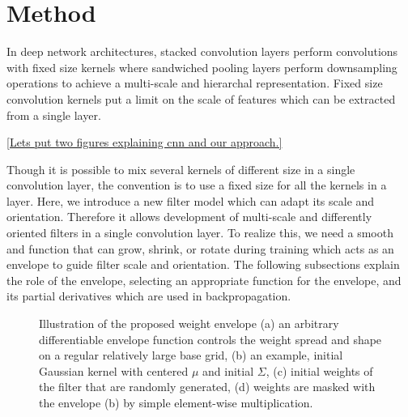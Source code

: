 \documentclass{bmvc2k}
\begin{document}
\section{Method}

\label{sec:methods}
In deep network architectures, stacked convolution layers perform convolutions with fixed size kernels where sandwiched pooling layers perform downsampling operations to achieve a multi-scale and hierarchal representation. Fixed size convolution kernels put a limit on the scale of features which can be extracted from a single layer. 

\ref{Lets put two figures explaining cnn and our approach.}

Though it is possible to mix several kernels of different size in a single convolution layer, the convention is to use a fixed size for all the kernels in a layer. Here, we introduce a new filter model which can adapt its scale and orientation. Therefore it allows development of multi-scale and differently oriented filters in a single convolution layer. To realize this, we need a smooth and  function that can grow, shrink, or rotate during training which acts as an envelope to guide filter scale and orientation. The following subsections explain the role of the envelope, selecting an appropriate function for the envelope, and its partial derivatives which are used in backpropagation.



%
\begin{figure}
	\centering     %
	
	
	\caption{Illustration of the proposed weight envelope (a) an arbitrary differentiable envelope function controls the weight spread and shape on a regular relatively large base grid, (b) an example, initial Gaussian kernel with centered $\mu$ and initial $\Sigma$, (c) initial weights of the filter that are randomly generated, (d) weights are masked with the envelope (b) by simple element-wise multiplication.}
	\label{fig1}
\end{figure}
\end{document}
